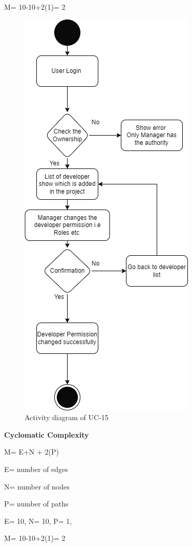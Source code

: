 M= 10-10+2(1)= 2

\begin{figure}[H]
    \centering
    \includegraphics[scale=0.7]{./diagrams/Activity Diagram/ad-15.png}
    \caption{Activity diagram of UC-15}
    \label{fig:act-15}

\end{figure}


\textbf{Cyclomatic Complexity}

M= E+N + 2(P)

E= number of edges

N= number of nodes

P= number of paths

E= 10,
N= 10,
P= 1,

M= 10-10+2(1)= 2

